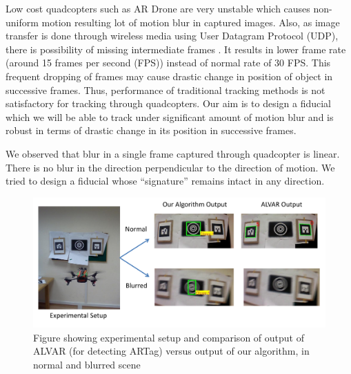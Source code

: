 \documentclass[runningheads]{llncs}
\begin{document}
Low cost quadcopters such as AR Drone are very unstable which causes non-uniform
motion resulting lot of motion blur in captured images. Also, as image transfer
is done through wireless media using User Datagram Protocol (UDP), there is
possibility of missing intermediate frames . It results in lower frame rate
(around 15 frames per second (FPS)) instead of normal rate of 30 FPS. This
frequent dropping of frames may cause drastic change in position of object in
successive frames. Thus, performance of traditional tracking methods is not
satisfactory for tracking through quadcopters. Our aim is to design a fiducial
which we will be able to track under significant amount of motion blur and is
robust in terms of drastic change in its position in successive frames.

We observed that blur in a single frame captured through quadcopter is linear.
There is no blur in the direction perpendicular to the direction of motion. We
tried to design a fiducial whose ``signature'' remains intact in any direction.

\begin{figure}
\includegraphics[width=\linewidth]{teaser.pdf}
\caption{Figure showing experimental setup and comparison of
output of ALVAR\cite{alvar} (for detecting ARTag) versus output of our
algorithm, in normal and blurred scene}
\end{figure}
 
\end{document}
